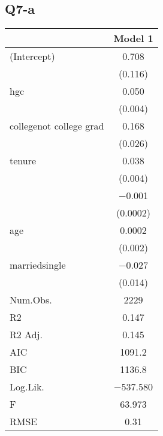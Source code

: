 \documentclass{article}
\begin{document}
\subsection*{Q7-a}
\begin{table}[h]
\centering
\begin{tabular}[t]{lc}
\hline
  & Model 1\\
\hline
(Intercept) & \num{0.708}\\
 & (\num{0.116})\\
hgc & \num{0.050}\\
 & \vphantom{1} (\num{0.004})\\
collegenot college grad & \num{0.168}\\
 & (\num{0.026})\\
tenure & \num{0.038}\\
 & (\num{0.004})\\
 & \num{-0.001}\\
 & (\num{0.0002})\\
age & \num{0.0002}\\
 & (\num{0.002})\\
marriedsingle & \num{-0.027}\\
 & (\num{0.014})\\
\hline
Num.Obs. & \num{2229}\\
R2 & \num{0.147}\\
R2 Adj. & \num{0.145}\\
AIC & \num{1091.2}\\
BIC & \num{1136.8}\\
Log.Lik. & \num{-537.580}\\
F & \num{63.973}\\
RMSE & \num{0.31}\\
\hline
\end{tabular}
\end{table}
\end{document}
